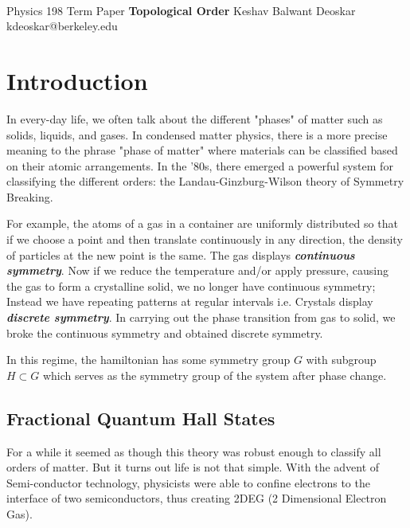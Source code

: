 \documentclass[11pt]{article}
\begin{document}
\thispagestyle{empty}
\bigskip \
\vspace{0.1cm}

\begin{center}
{\fontsize{22}{22} \selectfont Physics 198 Term Paper}
\vskip 16pt
{\fontsize{36}{36} \selectfont \bf \sffamily Topological Order}
\vskip 24pt
{\fontsize{18}{18} \selectfont \rmfamily Keshav Balwant Deoskar} 
\vskip 6pt
{\fontsize{14}{14} \selectfont \ttfamily kdeoskar@berkeley.edu} 
\vskip 24pt
\end{center}


\microtoc
\newpage

\section{Introduction}
In every-day life, we often talk about the different "phases" of matter such as solids, liquids, and gases. In condensed matter physics, there is a more precise meaning to the phrase "phase of matter" where materials can be classified based on their atomic arrangements. In the '80s, there emerged a powerful system for classifying the different orders: the Landau-Ginzburg-Wilson theory of Symmetry Breaking. 

\vskip 0.5cm

For example, the atoms of a gas in a container are uniformly distributed so that if we choose a point and then translate continuously in any direction, the density of particles at the new point is the same. The gas displays \textbf{\emph{continuous symmetry}}. Now if we reduce the temperature and/or apply pressure, causing the gas to form a crystalline solid, we no longer have continuous symmetry; Instead we have repeating patterns at regular intervals i.e. Crystals display \emph{\textbf{discrete symmetry}}. In carrying out the phase transition from gas to solid, we broke the continuous symmetry and obtained discrete symmetry.

\vskip 0.5cm
In this regime, the hamiltonian has some symmetry group $G$ with subgroup $H \subset G$ which serves as the symmetry group of the system after phase change.

\vskip 0.5cm
\subsection{Fractional Quantum Hall States}
\vskip 0.5cm 
For a while it seemed as though this theory was robust enough to classify all orders of matter. But it turns out life is not that simple. With the advent of Semi-conductor technology, physicists were able to confine electrons to the interface of two semiconductors, thus creating 2DEG (2 Dimensional Electron Gas).
\end{document}
